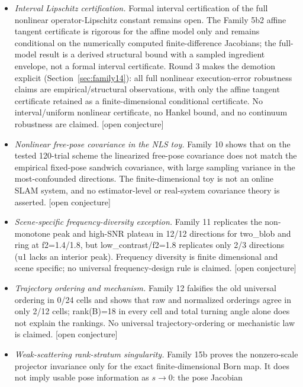\documentclass[12pt]{article}
\newcommand{\OPN}{\textnormal{[open conjecture]}}
\begin{document}
\begin{itemize}
finite scenario, that the current-space $G_S$ composition and range
containment hold while the $V_{GS}$/SOM and map-tangent $V_A$/$K_{\mathrm{eff}}$
mode subspaces are distinct. This is numerical evidence, not a continuum
theorem, and no pullback/composition theorem $A=G_ST_\chi$ or SOM quality
claim was proved. \OPN{}
\item \emph{Interval Lipschitz certification.} Formal interval certification of
the full nonlinear operator-Lipschitz constant remains open. The Family 5b2
affine tangent certificate is rigorous for the affine model only and remains
conditional on the numerically computed finite-difference Jacobians; the
full-model result is a derived structural bound with a sampled ingredient
envelope, not a formal interval certificate. Round 3 makes the demotion
explicit (Section~\ref{sec:family14}): all full nonlinear execution-error
robustness claims are empirical/structural observations, with only the affine
tangent certificate retained as a finite-dimensional conditional certificate.
No interval/uniform nonlinear certificate, no Hankel bound, and no continuum
robustness are claimed. \OPN{}
\item \emph{Nonlinear free-pose covariance in the NLS toy.} Family 10 shows
that on the tested 120-trial scheme the linearized free-pose covariance does
not match the empirical fixed-pose sandwich covariance, with large sampling
variance in the most-confounded directions. The finite-dimensional toy is not
an online SLAM system, and no estimator-level or real-system covariance theory
is asserted. \OPN{}
\item \emph{Scene-specific frequency-diversity exception.} Family 11
replicates the non-monotone peak and high-SNR plateau in 12/12 directions for
two\_blob and ring at f2=1.4/1.8, but low\_contrast/f2=1.8 replicates only
2/3 directions (u1 lacks an interior peak). Frequency diversity is finite
dimensional and scene specific; no universal frequency-design rule is claimed.
\OPN{}
\item \emph{Trajectory ordering and mechanism.} Family 12 falsifies the old
universal ordering in 0/24 cells and shows that raw and normalized orderings
agree in only 2/12 cells; rank(B)=18 in every cell and total turning angle
alone does not explain the rankings. No universal trajectory-ordering or
mechanistic law is claimed. \OPN{}
\item \emph{Weak-scattering rank-stratum singularity.} Family 15b proves the
nonzero-scale projector invariance only for the exact finite-dimensional Born
map. It does not imply usable pose information as $s\to0$: the pose Jacobian

\end{itemize}
\end{document}

